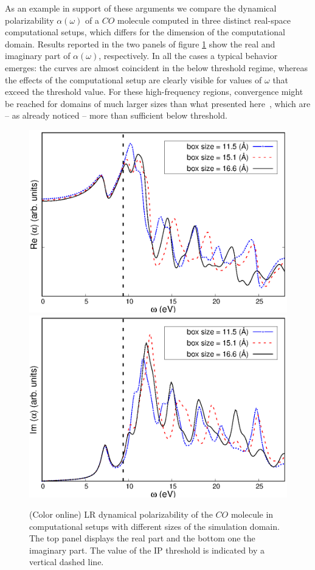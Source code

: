 \documentclass[reprint,aps,prb]{revtex4-1}
\begin{document}
As an example in support of these arguments we compare the {dynamical polarizability $\alpha(\omega)$} of a $CO$ molecule computed in three distinct real-space computational setups, which differs for the dimension of the computational domain.
Results reported in the two panels of figure \ref{co_spectrum} show the real and imaginary part of $\alpha(\omega)$, respectively. In all the cases a typical behavior emerges: the curves are almost coincident in the below threshold regime,
whereas the effects of the computational setup are clearly visible for values of  $\omega$ that exceed the threshold value.
For these high-frequency regions, convergence might be reached for domains of much larger sizes than what presented here~\cite{baroni2008},
which are -- as already noticed -- more than sufficient below threshold.

\begin{figure}
\centering
\subfloat
{\includegraphics[scale=0.56]{Fig2a_CO_AlphaOmegaReal.eps}} \\
\centering
\subfloat
{\includegraphics[scale=0.58]{Fig2b_CO_spectrum.eps}}
\caption{\label{co_spectrum}(Color online) LR dynamical polarizability of the $CO$ molecule in computational setups with different
sizes of the simulation domain. The top panel displays the real part and the bottom one the imaginary part. The value of the IP threshold
is indicated by a vertical dashed line.}
\end{figure}
\end{document}
